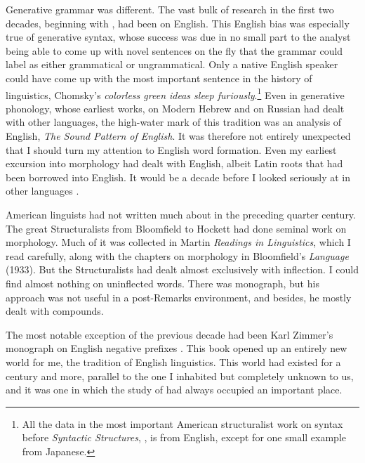 \documentclass[output=paper]{langsci/langscibook}
\begin{document}
\largerpage
Generative grammar was different. The vast bulk of research in the first
two decades, beginning with %
\citet{Chomsky56}%
%
, had been on
English. This English bias was especially true of generative syntax,
whose success was due in no small part to the analyst being able to come
up with novel sentences on the fly that the grammar could label as
either grammatical or ungrammatical. Only a native English speaker could
have come up with the most important sentence in the history of
linguistics, Chomsky's \emph{colorless green ideas sleep
furiously}.\footnote{All the data in the most important American
  structuralist work on syntax before \emph{Syntactic Structures}, 
\citet{Wells1947}%
, is from English, except for one small example from Japanese.}
Even in generative phonology, whose earliest works, %
\citet{Chomsky51} %
%
on
Modern Hebrew and %
\citet{Halle1959} %
%
on Russian had dealt with other
languages, the high-water mark of this tradition was an analysis of
English, \emph{The Sound Pattern of English}. It was therefore not
entirely unexpected that I should turn my attention to English word
formation. Even my earliest excursion into morphology had dealt with
English, albeit Latin roots that had been borrowed into English. It
would be a decade before I looked seriously at  in other
languages %
\citep{Aronoff84}%
%
.

  
American linguists had not written much about  in the
preceding quarter century. The great Structuralists from Bloomfield to
Hockett had done seminal work on morphology. Much of it was collected in Martin %
 \emph{Readings in Linguistics}, which I read
carefully, along with the chapters on morphology in Bloomfield's
\emph{Language} (1933). But the Structuralists had dealt almost
exclusively with inflection. I could find almost nothing on uninflected
words. There was %
%
monograph, but his approach was not
useful in a post-Remarks environment, and besides, he mostly dealt
with compounds.

The most notable exception of the previous decade had been Karl Zimmer's
monograph on English negative prefixes %
\citep{Zimmer64}%
%
. This book opened
up an entirely new world for me, the tradition of English linguistics.
This world had existed for a century and more, parallel to the one I
inhabited but completely unknown to us, and it was one in which the
study of  had always occupied an important place.
\end{document}
